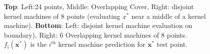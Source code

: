 \begin{figure}[t]
\caption{\textbf{Top}: Left:24 points, Middle: Overlapping Cover, Right: disjoint kernel machines of 8  points (evaluating $x^*$ near a middle of a kernel machine).  \textbf{Bottom}: Left: disjoint kernel machine evaluation on boundary),  Right: 6 Overlapping kernel machines of 8 points.  $f_i(\mathbf{x}^*)$ is the $i^{th}$ kernel machine prediction for $\mathbf{x}^*$ test point.}
\label{fig:overlapandnonoverlap_ex}
\vspace{-3mm}
\end{figure}